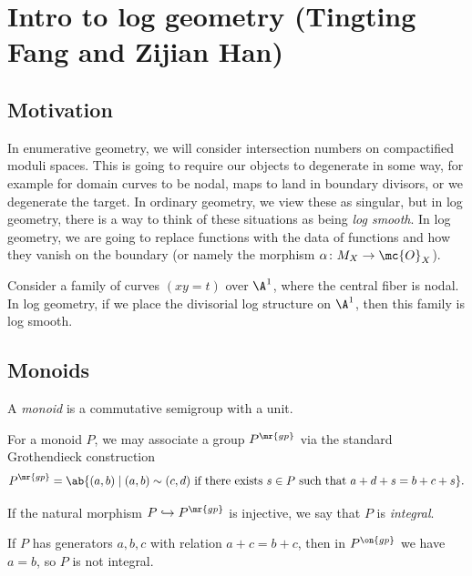 \section{Intro to log geometry (Tingting Fang and Zijian Han)}%
\label{sec:Intro to log geometry (Tingting Fang and Zijian Han)}

\subsection{Motivation}%
\label{sub:Motivation}

In enumerative geometry, we will consider intersection numbers on compactified moduli spaces. This is going to require our objects to degenerate in some way, for example for domain curves to be nodal, maps to land in boundary divisors, or we degenerate the target. In ordinary geometry, we view these as singular, but in log geometry, there is a way to think of these situations as being \textit{log smooth}. In log geometry, we are going to replace functions with the data of functions and how they vanish on the boundary (or namely the morphism \(\alpha \colon M_X \to \mc{O}_X\)).

\begin{exm}
    Consider a family of curves \((xy=t)\) over \(\A^1\), where the central fiber is nodal. In log geometry, if we place the divisorial log structure on \(\A^1\), then this family is log smooth.
\end{exm}

\subsection{Monoids}%
\label{sub:Monoids}

\begin{defn}
    A \textit{monoid} is a commutative semigroup with a unit. 
\end{defn}

For a monoid \(P\), we may associate a group \(P^{\mr{gp}}\) via the standard Grothendieck construction
\[ P^{\mr{gp}} = \ab\{(a,b) \mid (a,b) \sim (c,d) \text{ if there exists } s \in P \text{ such that } a+d+s = b+c+s \}. \]
\begin{defn}
If the natural morphism \(P \hookrightarrow P^{\mr{gp}}\) is injective, we say that \(P\) is \textit{integral}.
\end{defn}

\begin{exm}
    If \(P\) has generators \(a,b,c\) with relation \(a+c=b+c\), then in \(P^{\on{gp}}\) we have \(a = b\), so \(P\) is not integral.
\end{exm}

